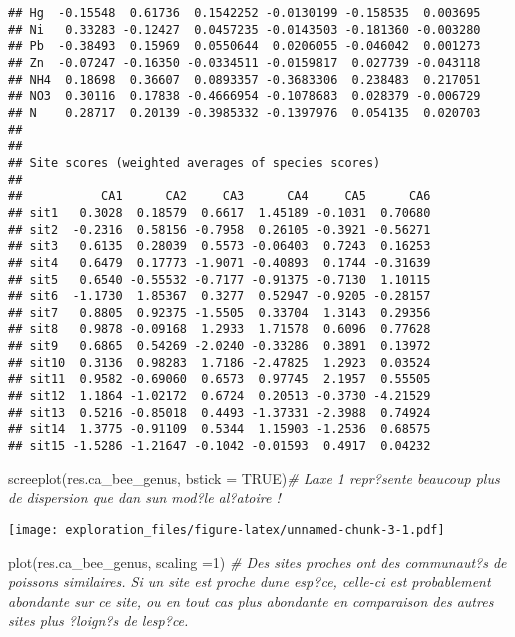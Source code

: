 \documentclass[
]{article}
\newenvironment{Shaded}{\begin{snugshade}}{\end{snugshade}}
\newcommand{\AttributeTok}[1]{\textcolor[rgb]{0.77,0.63,0.00}{#1}}
\newcommand{\CommentTok}[1]{\textcolor[rgb]{0.56,0.35,0.01}{\textit{#1}}}
\newcommand{\ConstantTok}[1]{\textcolor[rgb]{0.00,0.00,0.00}{#1}}
\newcommand{\DecValTok}[1]{\textcolor[rgb]{0.00,0.00,0.81}{#1}}
\newcommand{\FunctionTok}[1]{\textcolor[rgb]{0.00,0.00,0.00}{#1}}
\newcommand{\NormalTok}[1]{#1}
\begin{document}
\begin{verbatim}
## Hg  -0.15548  0.61736  0.1542252 -0.0130199 -0.158535  0.003695
## Ni   0.33283 -0.12427  0.0457235 -0.0143503 -0.181360 -0.003280
## Pb  -0.38493  0.15969  0.0550644  0.0206055 -0.046042  0.001273
## Zn  -0.07247 -0.16350 -0.0334511 -0.0159817  0.027739 -0.043118
## NH4  0.18698  0.36607  0.0893357 -0.3683306  0.238483  0.217051
## NO3  0.30116  0.17838 -0.4666954 -0.1078683  0.028379 -0.006729
## N    0.28717  0.20139 -0.3985332 -0.1397976  0.054135  0.020703
## 
## 
## Site scores (weighted averages of species scores)
## 
##           CA1      CA2     CA3      CA4     CA5      CA6
## sit1   0.3028  0.18579  0.6617  1.45189 -0.1031  0.70680
## sit2  -0.2316  0.58156 -0.7958  0.26105 -0.3921 -0.56271
## sit3   0.6135  0.28039  0.5573 -0.06403  0.7243  0.16253
## sit4   0.6479  0.17773 -1.9071 -0.40893  0.1744 -0.31639
## sit5   0.6540 -0.55532 -0.7177 -0.91375 -0.7130  1.10115
## sit6  -1.1730  1.85367  0.3277  0.52947 -0.9205 -0.28157
## sit7   0.8805  0.92375 -1.5505  0.33704  1.3143  0.29356
## sit8   0.9878 -0.09168  1.2933  1.71578  0.6096  0.77628
## sit9   0.6865  0.54269 -2.0240 -0.33286  0.3891  0.13972
## sit10  0.3136  0.98283  1.7186 -2.47825  1.2923  0.03524
## sit11  0.9582 -0.69060  0.6573  0.97745  2.1957  0.55505
## sit12  1.1864 -1.02172  0.6724  0.20513 -0.3730 -4.21529
## sit13  0.5216 -0.85018  0.4493 -1.37331 -2.3988  0.74924
## sit14  1.3775 -0.91109  0.5344  1.15903 -1.2536  0.68575
## sit15 -1.5286 -1.21647 -0.1042 -0.01593  0.4917  0.04232
\end{verbatim}

\begin{Shaded}
\begin{Highlighting}[]
\FunctionTok{screeplot}\NormalTok{(res.ca\_bee\_genus, }\AttributeTok{bstick =} \ConstantTok{TRUE}\NormalTok{)}\CommentTok{\# L\textquotesingle{}axe 1 repr?sente beaucoup plus de dispersion que dan sun mod?le al?atoire !}
\end{Highlighting}
\end{Shaded}

\texttt{[image: exploration\_files/figure-latex/unnamed-chunk-3-1.pdf]}

\begin{Shaded}
\begin{Highlighting}[]
\FunctionTok{plot}\NormalTok{(res.ca\_bee\_genus, }\AttributeTok{scaling =}\DecValTok{1}\NormalTok{) }\CommentTok{\# Des sites proches ont des communaut?s de poissons similaires. Si un site est proche d\textquotesingle{}une esp?ce, celle{-}ci est probablement abondante sur ce site, ou en tout cas plus abondante en comparaison des autres sites plus ?loign?s de l\textquotesingle{}esp?ce.}
\end{Highlighting}
\end{Shaded}
\end{document}

